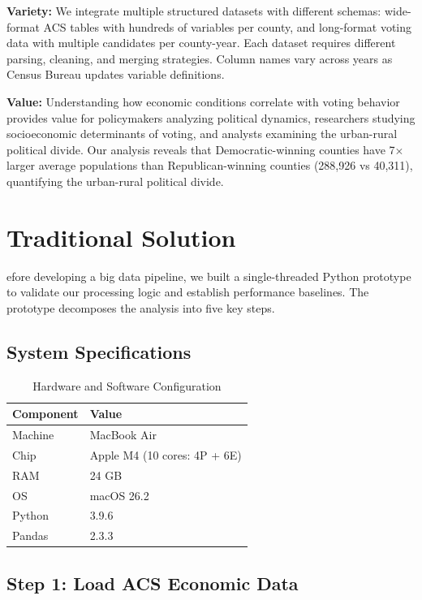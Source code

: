 \documentclass[9pt,a4paper,onecolumn,twoside]{tau-class/tau}
\begin{document}
\textbf{Variety:} We integrate multiple structured datasets with different schemas: wide-format ACS tables with hundreds of variables per county, and long-format voting data with multiple candidates per county-year. Each dataset requires different parsing, cleaning, and merging strategies. Column names vary across years as Census Bureau updates variable definitions.

\textbf{Value:} Understanding how economic conditions correlate with voting behavior provides value for policymakers analyzing political dynamics, researchers studying socioeconomic determinants of voting, and analysts examining the urban-rural political divide. Our analysis reveals that Democratic-winning counties have 7$\times$ larger average populations than Republican-winning counties (288,926 vs 40,311), quantifying the urban-rural political divide.


\section{Traditional Solution}

efore developing a big data pipeline, we built a single-threaded Python prototype to validate our processing logic and establish performance baselines. The prototype decomposes the analysis into five key steps.

\subsection{System Specifications}

\begin{table}[htbp]
\centering
\caption{Hardware and Software Configuration}
\label{tab:specs}
\begin{tabular}{ll}
\hline
Component & Value \\
\hline
Machine & MacBook Air \\
Chip & Apple M4 (10 cores: 4P + 6E) \\
RAM & 24 GB \\
OS & macOS 26.2 \\
Python & 3.9.6 \\
Pandas & 2.3.3 \\
\hline
\end{tabular}
\end{table}

\subsection{Step 1: Load ACS Economic Data}
\end{document}
